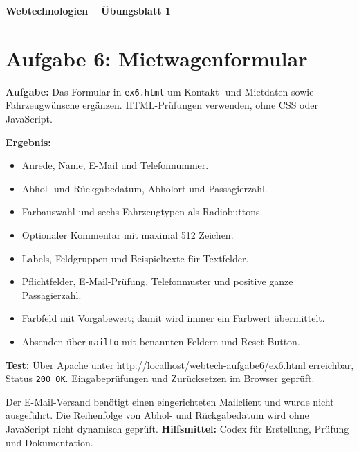 \documentclass[11pt,a4paper]{article}
\begin{document}
\begin{center}
  {\Large\textbf{Webtechnologien -- Übungsblatt 1}}
\end{center}
\section*{Aufgabe 6: Mietwagenformular}
\textbf{Aufgabe:} Das Formular in \texttt{ex6.html} um Kontakt- und
Mietdaten sowie Fahrzeugwünsche ergänzen. HTML-Prüfungen verwenden,
ohne CSS oder JavaScript.

\medskip
\textbf{Ergebnis:}
\begin{itemize}
  \item Anrede, Name, E-Mail und Telefonnummer.
  \item Abhol- und Rückgabedatum, Abholort und Passagierzahl.
  \item Farbauswahl und sechs Fahrzeugtypen als Radiobuttons.
  \item Optionaler Kommentar mit maximal 512 Zeichen.
  \item Labels, Feldgruppen und Beispieltexte für Textfelder.
  \item Pflichtfelder, E-Mail-Prüfung, Telefonmuster und positive ganze Passagierzahl.
  \item Farbfeld mit Vorgabewert; damit wird immer ein Farbwert übermittelt.
  \item Absenden über \texttt{mailto} mit benannten Feldern und Reset-Button.
\end{itemize}
\textbf{Test:} Über Apache unter
\url{http://localhost/webtech-aufgabe6/ex6.html} erreichbar,
Status \texttt{200 OK}. Eingabeprüfungen und Zurücksetzen im Browser geprüft.

\medskip
Der E-Mail-Versand benötigt einen eingerichteten Mailclient und wurde
nicht ausgeführt. Die Reihenfolge von Abhol- und Rückgabedatum wird
ohne JavaScript nicht dynamisch geprüft.
\medskip
{\small \textbf{Hilfsmittel:} Codex für Erstellung, Prüfung und Dokumentation.}
\end{document}
